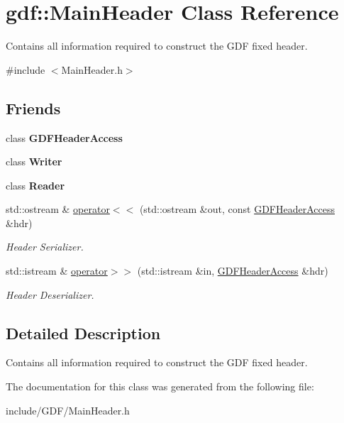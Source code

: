 \hypertarget{classgdf_1_1_main_header}{
\section{gdf::MainHeader Class Reference}
\label{classgdf_1_1_main_header}
}


Contains all information required to construct the GDF fixed header.  




{\ttfamily \#include $<$MainHeader.h$>$}

\subsection*{Friends}
\begin{DoxyCompactItemize}
\item 
\hypertarget{classgdf_1_1_main_header_ade47bf1d3f5a91747dd7fbb489fbcab0}{
class {\bfseries GDFHeaderAccess}}
\label{classgdf_1_1_main_header_ade47bf1d3f5a91747dd7fbb489fbcab0}

\item 
\hypertarget{classgdf_1_1_main_header_ab699d593c3b9dee1ed8d700a93d70700}{
class {\bfseries Writer}}
\label{classgdf_1_1_main_header_ab699d593c3b9dee1ed8d700a93d70700}

\item 
\hypertarget{classgdf_1_1_main_header_a35cb182752752c74a30050705acc3c06}{
class {\bfseries Reader}}
\label{classgdf_1_1_main_header_a35cb182752752c74a30050705acc3c06}

\item 
\hypertarget{classgdf_1_1_main_header_a0dd6213f6ada6c22b9c2e8e7890305a2}{
std::ostream \& \hyperlink{classgdf_1_1_main_header_a0dd6213f6ada6c22b9c2e8e7890305a2}{operator$<$$<$} (std::ostream \&out, const \hyperlink{classgdf_1_1_g_d_f_header_access}{GDFHeaderAccess} \&hdr)}
\label{classgdf_1_1_main_header_a0dd6213f6ada6c22b9c2e8e7890305a2}

\begin{DoxyCompactList}\small\item\em Header Serializer. \item\end{DoxyCompactList}\item 
\hypertarget{classgdf_1_1_main_header_a0a4dea8648fdd7b1131f900f772d2961}{
std::istream \& \hyperlink{classgdf_1_1_main_header_a0a4dea8648fdd7b1131f900f772d2961}{operator$>$$>$} (std::istream \&in, \hyperlink{classgdf_1_1_g_d_f_header_access}{GDFHeaderAccess} \&hdr)}
\label{classgdf_1_1_main_header_a0a4dea8648fdd7b1131f900f772d2961}

\begin{DoxyCompactList}\small\item\em Header Deserializer. \item\end{DoxyCompactList}\end{DoxyCompactItemize}


\subsection{Detailed Description}
Contains all information required to construct the GDF fixed header. 

The documentation for this class was generated from the following file:\begin{DoxyCompactItemize}
\item 
include/GDF/MainHeader.h\end{DoxyCompactItemize}
